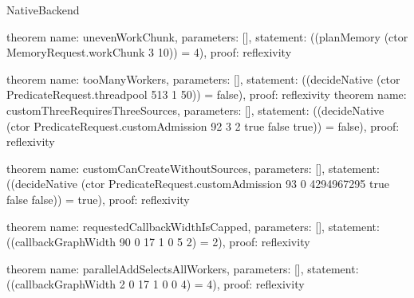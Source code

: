 \begin{lexlean}{NativeBackend}
\begin{semanticmodule}
theorem{
  name: unevenWorkChunk,
  parameters: [],
  statement: ((planMemory (ctor MemoryRequest.workChunk 3 10)) = 4),
  proof: reflexivity{}
}

theorem{
  name: tooManyWorkers,
  parameters: [],
  statement: ((decideNative (ctor PredicateRequest.threadpool 513 1 50)) = false),
  proof: reflexivity{}
}
theorem{
  name: customThreeRequiresThreeSources,
  parameters: [],
  statement: ((decideNative (ctor PredicateRequest.customAdmission 92 3 2 true false true)) = false),
  proof: reflexivity{}
}

theorem{
  name: customCanCreateWithoutSources,
  parameters: [],
  statement: ((decideNative (ctor PredicateRequest.customAdmission 93 0 4294967295 true false false)) = true),
  proof: reflexivity{}
}

theorem{
  name: requestedCallbackWidthIsCapped,
  parameters: [],
  statement: ((callbackGraphWidth 90 0 17 1 0 5 2) = 2),
  proof: reflexivity{}
}

theorem{
  name: parallelAddSelectsAllWorkers,
  parameters: [],
  statement: ((callbackGraphWidth 2 0 17 1 0 0 4) = 4),
  proof: reflexivity{}
}

\end{semanticmodule}
\end{lexlean}
